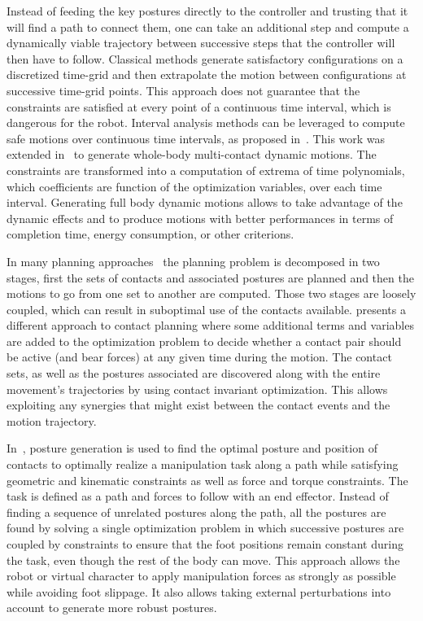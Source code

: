 Instead of feeding the key postures directly to the controller and trusting that it will find a path to connect them, one can take an additional step and compute a dynamically viable trajectory between successive steps that the controller will then have to follow.
Classical methods generate satisfactory configurations on a discretized time-grid and then extrapolate the motion between configurations at successive time-grid points.
This approach does not guarantee that the constraints are satisfied at every point of a continuous time interval, which is dangerous for the robot.
Interval analysis methods can be leveraged to compute safe motions over continuous time intervals, as proposed in~\cite{lengagne2011planning}.
This work was extended in~\cite{lengagne2013generation} to generate whole-body multi-contact dynamic motions.
The constraints are transformed into a computation of extrema of time polynomials, which coefficients are function of the optimization variables, over each time interval.
Generating full body dynamic motions allows to take advantage of the dynamic effects and to produce motions with better performances in terms of completion time, energy consumption, or other criterions.

In many planning approaches~\cite{kuffner2005motion, chestnutt2007navigation, hauser:ijrr:2008, kolter2008control, bouyarmane:icra:2011} the planning problem is decomposed in two stages, first the sets of contacts and associated postures are planned and then the motions to go from one set to another are computed.
Those two stages are loosely coupled, which can result in suboptimal use of the contacts available.
\cite{mordatch:acm:2012} presents a different approach to contact planning where some additional terms and variables are added to the optimization problem to decide whether a contact pair should be active (and bear forces) at any given time during the motion.
The contact sets, as well as the postures associated are discovered along with the entire movement's trajectories by using contact invariant optimization.
This allows exploiting any synergies that might exist between the contact events and the motion trajectory.

In~\cite{liu:acm:2012}, posture generation is used to find the optimal posture and position of contacts to optimally realize a manipulation task along a path while satisfying geometric and kinematic constraints as well as force and torque constraints.
The task is defined as a path and forces to follow with an end effector.
Instead of finding a sequence of unrelated postures along the path, all the postures are found by solving a single optimization problem in which successive postures are coupled by constraints to ensure that the foot positions remain constant during the task, even though the rest of the body can move.
This approach allows the robot or virtual character to apply manipulation forces as strongly as possible while avoiding foot slippage.
It also allows taking external perturbations into account to generate more robust postures.

